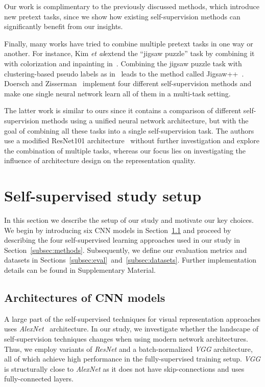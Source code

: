 \documentclass[10pt,twocolumn,letterpaper]{article}
\def\etal{\emph{et al}\onedot}
\begin{document}
Our work is complimentary to the previously discussed methods, which introduce new pretext tasks, since we show how existing self-supervision methods can significantly benefit from our insights.

Finally, many works have tried to combine multiple pretext tasks in one way or another.
For instance, Kim \etal extend the ``jigsaw puzzle'' task by combining it with colorization and inpainting in~\cite{kim2018learning}.
Combining the jigsaw puzzle task with clustering-based pseudo labels as in~\cite{caron2018deep} leads to the method called Jigsaw++~\cite{noroozi2018boosting}.
Doersch and Zisserman~\cite{doersch2017multi} implement four different self-supervision methods and make one single neural network learn all of them in a multi-task setting.

The latter work is similar to ours since it contains a comparison of different self-supervision methods using a unified neural network architecture, but with the goal of combining all these tasks into a single self-supervision task.
The authors use a modified ResNet101 architecture~\cite{he2016deep} without further investigation and explore the combination of multiple tasks, whereas our focus lies on investigating the influence of architecture design on the representation quality.


\section{Self-supervised study setup}\label{sec:eval}

In this section we describe the setup of our study and motivate our key choices.
We begin by introducing six CNN models in Section~\ref{subsec:cnn_models} and proceed by describing the four self-supervised learning approaches used in our study in Section~\ref{subsec:methods}.
Subsequently, we define our evaluation metrics and datasets in Sections~\ref{subsec:eval}~and~\ref{subsec:datasets}. 
Further implementation details can be found in Supplementary Material.

\subsection{Architectures of CNN models}\label{subsec:cnn_models}

A large part of the self-supervised techniques for visual representation approaches uses \emph{AlexNet}~\cite{KrizhevskyNIPS12} architecture.
In our study, we investigate whether the landscape of self-supervision techniques changes when using modern network architectures.
Thus, we employ variants of \emph{ResNet} and a batch-normalized \emph{VGG} architecture, all of which achieve high performance in the fully-supervised training setup.
\emph{VGG} is structurally close to \emph{AlexNet} as it does not have skip-connections and uses fully-connected layers.
\end{document}
